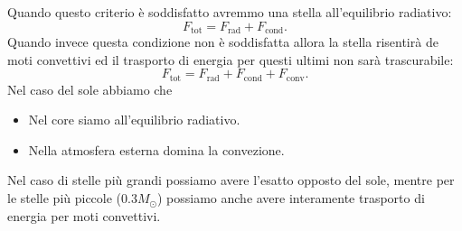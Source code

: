 Quando questo criterio è soddisfatto avremmo una stella all'equilibrio radiativo:
\[
	F_\text{tot} = F_\text{rad} + F_\text{cond} 
.\] 
Quando invece questa condizione non è soddisfatta allora la stella risentirà de moti convettivi ed il trasporto di energia per questi ultimi non sarà trascurabile:
\[
	F_\text{tot} = F_\text{rad} + F_\text{cond} + F_\text{conv} 
.\] 
Nel caso del sole abbiamo che 
\begin{itemize}
	\item Nel core siamo all'equilibrio radiativo.
	\item Nella atmosfera esterna domina la convezione.
\end{itemize}
Nel caso di stelle più grandi possiamo avere l'esatto opposto del sole, mentre per le stelle più piccole (0.3$M_{\odot}$) possiamo anche avere interamente trasporto di energia per moti convettivi.\\
